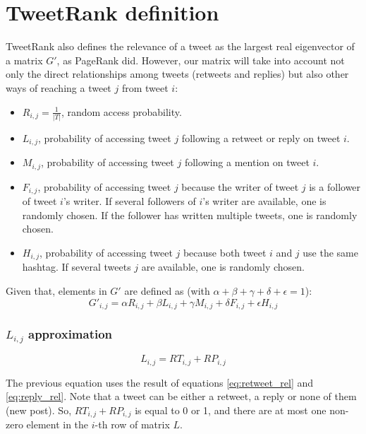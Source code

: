 \section{TweetRank definition}\label{sec:tweetrank_definition}
TweetRank also defines the relevance of a tweet as the largest real eigenvector of a matrix $G'$, as PageRank did. However, our matrix will take into account not only the direct relationships among tweets (retweets and replies) but also other ways of reaching a tweet $j$ from tweet $i$:  
\begin{itemize}
\item $R_{i,j} = \frac{1}{|T|}$, random access probability.
\item $L_{i,j}$, probability of accessing tweet $j$ following a retweet or reply on tweet $i$.
\item $M_{i,j}$, probability of accessing tweet $j$ following a mention on tweet $i$.
\item $F_{i,j}$, probability of accessing tweet $j$ because the writer of tweet $j$ is a follower of tweet $i$'s writer. If several followers of $i$'s writer are available, one is randomly chosen. If the follower has written multiple tweets, one is randomly chosen.
\item $H_{i,j}$, probability of accessing tweet $j$ because both tweet $i$ and $j$ use the same hashtag. If several tweets $j$ are available, one is randomly chosen.
\end{itemize}

Given that, elements in $G'$ are defined as (with $\alpha + \beta + \gamma + \delta + \epsilon = 1$):
\begin{equation}\label{eq:tweetrank}
G'_{i,j} = \alpha R_{i,j} + \beta L_{i,j} + \gamma M_{i,j} + \delta F_{i,j} + \epsilon H_{i,j}
\end{equation}

\subsubsection*{$L_{i,j}$ approximation}
\begin{equation}\label{eq:ref_prob}
L_{i,j} = RT_{i,j} + RP_{i,j}
\end{equation}

The previous equation uses the result of equations \ref{eq:retweet_rel} and \ref{eq:reply_rel}. Note that a tweet can be either a retweet, a reply or none of them (new post). So, $RT_{i,j} + RP_{i,j}$ is equal to 0 or 1, and there are at most one non-zero element in the $i$-th row of matrix $L$.

